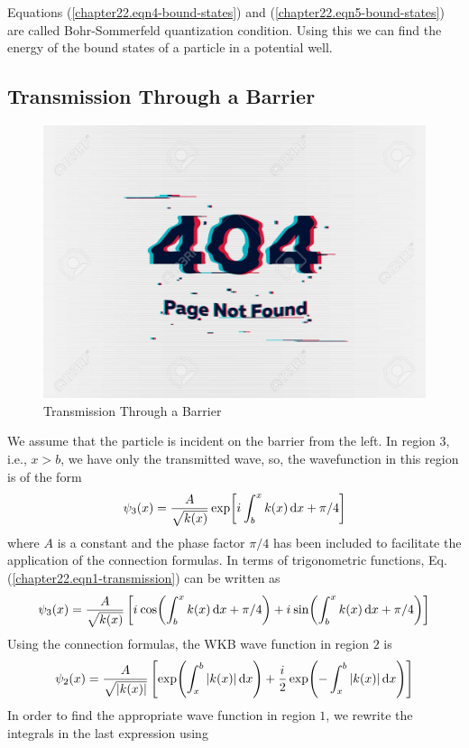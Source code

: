 Equations (\ref{chapter22.eqn4-bound-states}) and (\ref{chapter22.eqn5-bound-states}) are called Bohr-Sommerfeld quantization condition. Using this we can find the energy of the bound states of a particle in a potential well.

\subsection{Transmission Through a Barrier}
\begin{figure}
	\centering
	\includegraphics[width=0.5\linewidth]{Pictures/not-found.jpg}
	\caption{Transmission Through a Barrier}
	\label{chapter22.fig5}
\end{figure}
We assume that the particle is incident on the barrier from the left. In region $3$, i.e., $x>b$, we have only the transmitted wave, so, the wavefunction in this region is of the form
\begin{equation}
	\label{chapter22.eqn1-transmission}
	\psi_3\qty(x) = \frac{A}{\sqrt{k(x)}} \exp[{i\mkern1mu} \int_{b}^{x} k(x) \dd{x} + \pi/ 4]
\end{equation}
where $A$ is a constant and the phase factor $\pi/4$
has been included to facilitate the application of the connection formulas. In terms of trigonometric functions, Eq. (\ref{chapter22.eqn1-transmission}) can be written as
\begin{equation}
\label{chapter22.eqn2-transmission}
\psi_3\qty(x) = \frac{A}{\sqrt{k(x)}} \left[{i\mkern1mu} \cos(\int_{b}^{x} k(x) \dd{x} + \pi/ 4) + {i\mkern1mu} \sin(\int_{b}^{x} k(x) \dd{x} + \pi/ 4)\right]
\end{equation}
Using the connection formulas, the WKB wave function in region $2$ is
\begin{equation}
\label{chapter22.eqn3-transmission}
\psi_2(x) = \frac{A}{\sqrt{\abs{k(x)}}} \left[
\exp(\int_{x}^{b} \abs{k(x)} \dd{x}) + \frac{{i\mkern1mu}}{2} \exp(-\int_{x}^{b} \abs{k(x)} \dd{x})
\right]
\end{equation}
In order to find the appropriate wave function in region $1$, we rewrite the integrals in the last expression using

